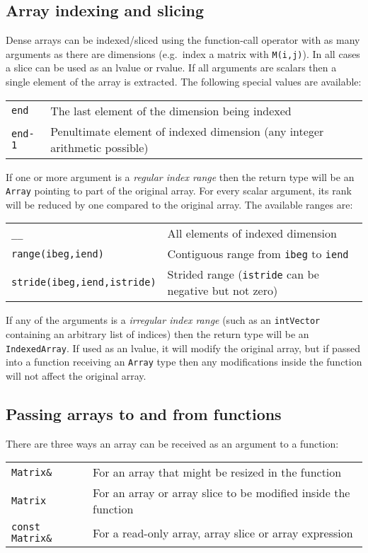 \documentclass[10pt,a4,landscape]{article}
\def\code#1{\texttt{#1}}
\begin{document}
\subsection*{Array indexing and slicing}
Dense arrays can be indexed/sliced using the function-call operator
with as many arguments as there are dimensions (e.g.\ index a matrix
with \code{M(i,j)}). In all cases a slice can be used as an lvalue or
rvalue. If all arguments are scalars then a single element of the
array is extracted. The following special values are available:\\
\begin{tabular}{ll}
\code{end} & The last element of the dimension being indexed\\
\code{end-1} & Penultimate element of indexed dimension (any integer arithmetic possible)\\
\end{tabular}

If one or more argument is a \textit{regular index range} then the return
type will be an \code{Array} pointing to part of the original
array. For every scalar argument, its rank will be reduced by one
compared to the original array. The available ranges are:\\
\begin{tabular}{ll}
\code{\_\_} & All elements of indexed dimension \\
\code{range(ibeg,iend)} & Contiguous range from \code{ibeg} to \code{iend}\\
\code{stride(ibeg,iend,istride)} & Strided range (\code{istride} can be negative but not zero)\\
\end{tabular}

If any of the arguments is a \textit{irregular index range} (such as
an \code{intVector} containing an arbitrary list of indices) then the
return type will be an \code{IndexedArray}. If used as an lvalue, it
will modify the original array, but if passed into a function
receiving an \code{Array} type then any modifications inside the
function will not affect the original array.
\subsection*{Passing arrays to and from functions}
There are three ways an array can be received as an argument to a function:\\
\begin{tabular}{ll}
\code{Matrix\&} & For an array that might be resized in the function\\
\code{Matrix} & For an array or array slice to be modified inside the function\\
\code{const Matrix\&} & For a read-only array, array slice or array expression\\
\end{tabular}
\end{document}
